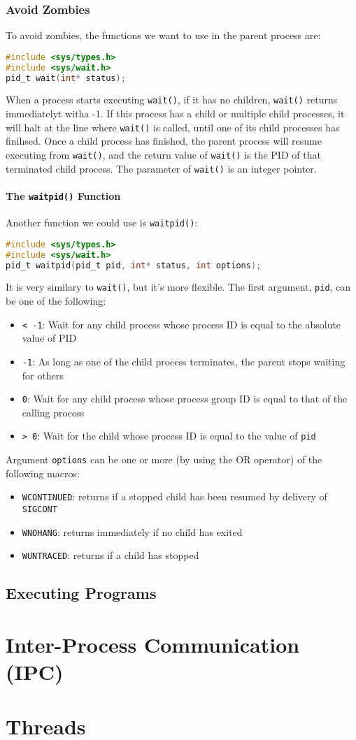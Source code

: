 \documentclass{article}
\renewcommand{\b}{\item[$\circ$]}
\newcommand{\newlist}{\begin{itemize}}
\renewcommand{\endlist}{\end{itemize}}
\newcommand{\code}[1]{\texttt{#1}}
\begin{document}
\subsubsection{Avoid Zombies}

To avoid zombies, the functions we want to use in the parent process are:

\begin{lstlisting}[language=c]
#include <sys/types.h>
#include <sys/wait.h>
pid_t wait(int* status);
\end{lstlisting}

\noindent When a process starts executing \code{wait()}, if it has no children, \code{wait()} returns immediatelyt witha  -1. If this process has a child or multiple child processes, it will halt at the line where \code{wait()} is called, until one of its child processes has finihsed. Once a child process has finished, the parent process will resume executing from \code{wait()}, and the return value of \code{wait()} is the PID of that terminated child process. The parameter of \code{wait()} is an integer pointer. 

\paragraph{The \code{waitpid()} Function}

Another function we could use is \code{waitpid()}:

\begin{lstlisting}[language=c]
#include <sys/types.h>
#include <sys/wait.h>
pid_t waitpid(pid_t pid, int* status, int options);
\end{lstlisting}

\noindent It is very similary to \code{wait()}, but it's more flexible. The first argument, \code{pid}, can be one of the following:

\newlist
\b \code{< -1}: Wait for any child process whose process ID is equal to the absolute value of PID
\b \code{-1}: As long as one of the child process terminates, the parent stops waiting for others
\b \code{0}: Wait for any child process whose process group ID is equal to that of the calling process
\b \code{> 0}: Wait for the child whose process ID is equal to the value of \code{pid}
\endlist

\noindent Argument \code{options} can be one or more (by using the OR operator) of the following macros:

\newlist
\b \code{WCONTINUED}: returns if a stopped child has been resumed by delivery of \code{SIGCONT}
\b \code{WNOHANG}: returns immediately if no child has exited
\b \code{WUNTRACED}: returns if a child has stopped
\endlist

\subsection{Executing Programs}



\newpage
\section{Inter-Process Communication (IPC)}
\section{Threads}
\end{document}
